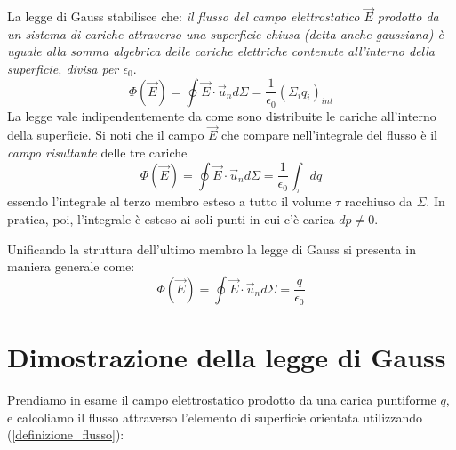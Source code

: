 \documentclass[class=book, crop=false, oneside, 12pt]{standalone}
\begin{document}
La legge di Gauss stabilisce che: 
\emph{il flusso del campo elettrostatico \(\overrightarrow{E}\) prodotto da un sistema di cariche attraverso una superficie chiusa (detta anche gaussiana) è uguale alla somma algebrica delle cariche elettriche contenute all'interno della superficie, divisa per \(\epsilon_0\)}.
\begin{equation}
    \Phi (\overrightarrow{E}) = \oint \overrightarrow{E} \cdot \overrightarrow{u}_n d \Sigma = \frac{1}{\epsilon_0} (\Sigma_i q_i)_{int}
\end{equation}
La legge vale indipendentemente da come sono distribuite le cariche all'interno della superficie.
Si noti che il campo \(\overrightarrow{E}\) che compare nell'integrale del flusso è il \emph{campo risultante} delle tre cariche
\begin{equation}
    \Phi (\overrightarrow{E}) = \oint \overrightarrow{E} \cdot \overrightarrow{u}_n d \Sigma = \frac{1}{\epsilon_0} \int_{\tau} dq
\end{equation}
essendo l'integrale al terzo membro esteso a tutto il volume \(\tau\) racchiuso da \(\Sigma\). 
In pratica, poi, l'integrale è esteso ai soli punti in cui c'è carica \(dp \neq 0\). 

Unificando la struttura dell'ultimo membro la legge di Gauss si presenta in maniera generale come:
\begin{equation}
    \Phi (\overrightarrow{E}) = \oint \overrightarrow{E} \cdot \overrightarrow{u}_n d \Sigma = \frac{q}{\epsilon_0}
\end{equation}

\section{Dimostrazione della legge di Gauss}

Prendiamo in esame il campo elettrostatico prodotto da una carica puntiforme \(q\), e calcoliamo il flusso attraverso l'elemento di superficie orientata utilizzando (\ref{definizione_flusso}):
\end{document}

